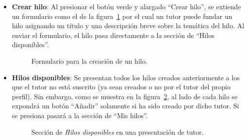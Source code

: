 \documentclass[a4paper, 12pt]{book}
\begin{document}
\begin{itemize}
  \item {\bfseries Crear hilo}: Al presionar el bot\'on verde y alargado ``Crear hilo'', se extiende un formulario como el de la figura~\ref{figura:tutor1} 
  por el cual un tutor puede fundar un hilo asignando un t\'itulo y una descripci\'on breve sobre la tem\'atica del hilo. Al enviar el formulario, el hilo 
  pasa directamente a la secci\'on de ``Hilos disponibles''.
  \begin{figure}[htbp] 
    \centering
    \caption{Formulario para la creaci\'on de un hilo.}
    \label{figura:tutor1}
  \end{figure}
  
  \item {\bfseries Hilos disponibles}: Se presentan todos los hilos creados anteriormente a los que el tutor no est\'a suscrito (ya sean creados o no por 
  el tutor del propio perfil). Sin embargo, como se muestra en la figura~\ref{figura:tutor2}, al lado de cada hilo se expondr\'a un bot\'on ``A\~nadir'' 
  solamente si ha sido creado por dicho tutor. Si se presiona pasar\'a a la secci\'on de ``Mis hilos''.
  \begin{figure}[htbp] 
    \centering
    \caption{Secci\'on de \textit{Hilos disponibles} en una presentaci\'on de tutor.}
    \label{figura:tutor2}
  \end{figure}
  

\end{itemize}
\end{document}
